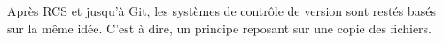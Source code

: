 Après \gls{RCS} et jusqu'à Git, les systèmes de contrôle de version sont restés basés sur la même idée. C'est à dire, un principe reposant sur une copie des fichiers.